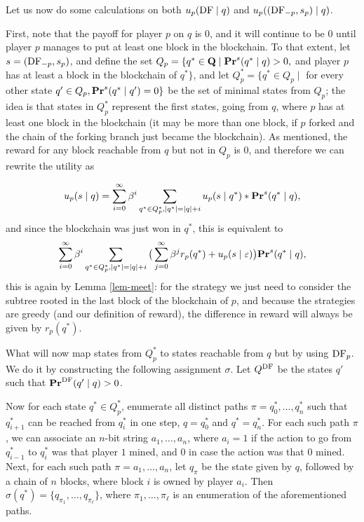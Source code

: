Let us now do some calculations on both $u_p(\text{\rm DF} \mid q)$ and $u_p( (\text{\rm DF}_{-p},s_p) \mid q)$. 
\medskip

First, note that the payoff for player $p$ on $q$ is $0$, and it will continue to be $0$ until player $p$ manages to put at least one block in the blockchain. To that extent, let $s = (\text{\rm DF}_{-p},s_p)$, and define the set 
$Q_p = \{q^* \in \mathbf{Q} \mid \mathbf{Pr}^s(q^* \mid q) > 0, $ and player $p$ has at least a block in the blockchain of $q^* \}$, 
and let $Q^*_p=\{q^* \in Q_p \mid$ for every other state $q' \in Q_p, \mathbf{Pr}^s(q^* \mid q')=0 \}$ be the set of minimal states from $Q_p$; 
the idea is that states in $Q^*_p$ represent the first states, going from $q$, where $p$ has at least one block in the blockchain 
(it may be more than one block, if $p$ forked and the chain of the forking branch just became the blockchain). 
As mentioned, the reward for any block reachable from $q$ but not in $Q_p$ is $0$, and therefore we can rewrite the utility as

$$u_p( s \mid q) = \sum_{i=0}^\infty \beta^i \sum_{q^* \in Q^*_p, |q^*| = |q| + i} u_p(s \mid q^*) * \mathbf{Pr}^s(q^* \mid q), $$
and since the blockchain was just won in $q^*$, %
this is equivalent to 
$$ \sum_{i=0}^\infty \beta^i \sum_{q^* \in Q^*_p, |q^*| = |q| + i} \big(\sum_{j = 0}^\infty \beta^j r_p(q^*) + u_p(s \mid \varepsilon) \big) \mathbf{Pr}^s(q^* \mid q), $$
this is again by Lemma \ref{lem-meet}: for the strategy we just need to consider the subtree rooted in the last block of the blockchain of $p$, and 
because the strategies are greedy (and our definition of reward), the difference in reward will always be given by $r_p(q^*)$. 

What will now map states from $Q^*_p$ to states reachable from $q$ but by using $\text{\rm DF}_p$. We do it by constructing the following assignment $\sigma$.
Let $Q^{\text{\rm DF}}$ be the states $q'$ such that $\mathbf{Pr}^{\text{\rm DF}}(q' \mid q) > 0$. 

Now for each state $q^* \in Q^*_p$, enumerate all distinct paths $\pi = q^*_0,\dots,q_n^*$ such that $q_{i+1}^*$ can be reached from 
$q_i^*$ in one step, $q = q_0^*$ and $q^* = q_n^*$. For each such path $\pi$, we can associate an $n$-bit string $a_1,\dots,a_n$, 
where $a_i = 1$ if the action to go from $q_{i-1}^*$ to $q_i^*$ was that player $1$ mined, and $0$ in case the action was that $0$ mined. 
Next, for each such path $\pi = a_1,\dots,a_n$, let $q_\pi$ be the state given by $q$, followed by a chain of $n$ blocks, where block $i$ is 
owned by player $a_i$. Then $\sigma(q^*) = \{q_{\pi_1},\dots,q_{\pi_\ell}\}$, where $\pi_1,\dots,\pi_\ell$ is an enumeration of the aforementioned paths. 

